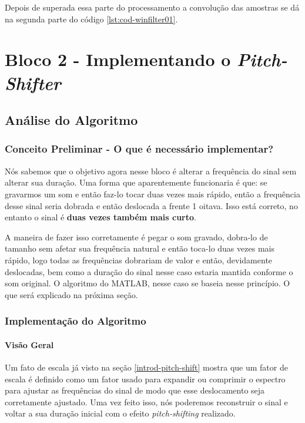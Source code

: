 		Depois de superada essa parte do processamento a convolução das amostras se dá na segunda parte do código \ref{lst:cod-winfilter01}.
		
				
\section{Bloco 2 - Implementando o \textit{Pitch-Shifter}}

	\subsection{Análise do Algoritmo}
		\subsubsection{Conceito Preliminar - O que é necessário implementar?}
			
			Nós sabemos que o objetivo agora nesse bloco é alterar a frequência do sinal sem alterar sua duração. Uma forma que aparentemente funcionaria é que: se gravarmos um som e então faz-lo tocar duas vezes mais rápido, então a frequência desse sinal seria dobrada e então deslocada a frente 1 oitava. Isso está correto, no entanto o sinal é \textbf{duas vezes também mais curto}.
			
			A maneira de fazer isso corretamente é pegar o som gravado, dobra-lo de tamanho sem afetar sua frequência natural e então toca-lo duas vezes mais rápido, logo todas as frequências dobrariam de valor e então, devidamente deslocadas, bem como a duração do sinal nesse caso estaria mantida conforme o som original. O algoritmo do MATLAB, nesse caso se baseia nesse princípio. O que será explicado na próxima seção.
			
		\subsubsection{Implementação do Algoritmo}
			\paragraph{Visão Geral}		
				
				Um fato de escala já visto na seção \ref{introd-pitch-shift} mostra que um fator de escala é definido como um fator usado para expandir ou comprimir o espectro para ajustar as frequências do sinal de modo que esse deslocamento seja corretamente ajustado. Uma vez feito isso, nós poderemos reconstruir o sinal e voltar a sua duração inicial com o efeito \textit{pitch-shifting} realizado.
				

